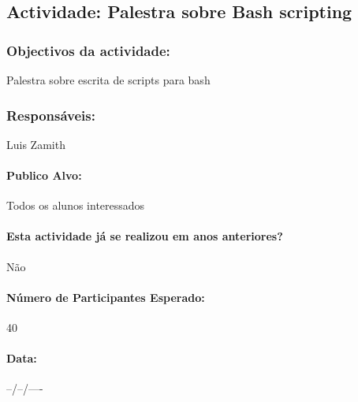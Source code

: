 \subsection{Actividade: Palestra sobre Bash scripting} %

\subsubsection*{Objectivos da actividade:}
Palestra sobre escrita de scripts para bash

\subsubsection*{Responsáveis:}
\begin{itemizedash}
	\item{Luis Zamith}
\end{itemizedash}

\paragraph{Publico Alvo: }
Todos os alunos interessados

\paragraph{Esta actividade já se realizou em anos anteriores?}
Não

\paragraph{Número de Participantes Esperado:}
40

\paragraph{Data:} --/--/----

\vspace{20pt}
